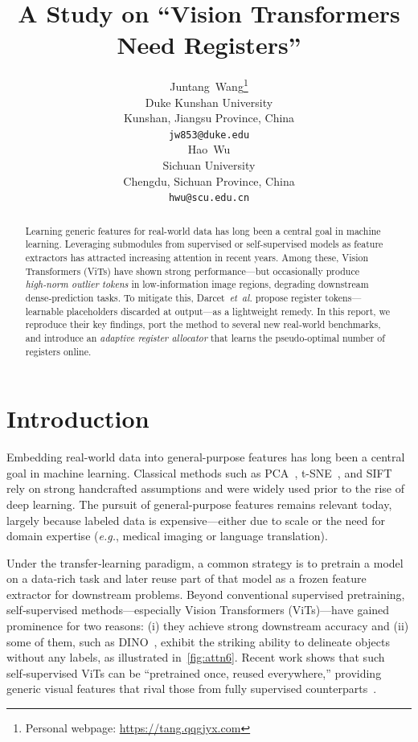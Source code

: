\documentclass{article}
\title{A Study on ``Vision Transformers Need Registers''}
\author{%
  Juntang~Wang\thanks{Personal webpage: \url{https://tang.qqgjyx.com}} \\
  Duke Kunshan University\\
  Kunshan, Jiangsu Province, China \\
  \texttt{jw853@duke.edu} \\
  \And
  Hao~Wu \\
  Sichuan University \\
  Chengdu, Sichuan Province, China \\
  \texttt{hwu@scu.edu.cn}
}
\newcommand{\citep}{\parencite}
\begin{document}
\maketitle


\begin{abstract}
    Learning generic features for real-world data has long been a central goal in machine learning.
    Leveraging submodules from supervised or self-supervised models as feature extractors has attracted increasing attention in recent years.
    Among these, Vision Transformers (ViTs) have shown strong performance—but occasionally produce \emph{high‑norm outlier tokens} in low‑information image regions, degrading downstream dense‑prediction tasks.
    To mitigate this, Darcet~\emph{et~al.} propose register tokens—learnable placeholders discarded at output—as a lightweight remedy. 
    In this report, we reproduce their key findings, port the method to several new real‑world benchmarks, and introduce an \emph{adaptive register allocator} that learns the pseudo‑optimal number of registers online.
\end{abstract}

\section{Introduction}
\label{sec:intro}
Embedding real-world data into general-purpose features has long been a central goal in machine learning.
Classical methods such as PCA~\citep{jolliffePrincipalComponentAnalysis1986}, t-SNE~\citep{maatenVisualizingDataUsing2008}, and SIFT~\citep{loweDistinctiveImageFeatures2004} rely on strong handcrafted assumptions and were widely used prior to the rise of deep learning. 
The pursuit of general-purpose features remains relevant today, largely because labeled data is expensive—either due to scale or the need for domain expertise (\emph{e.g.}, medical imaging or language translation).

Under the transfer‑learning paradigm, a common strategy is to pretrain a model on a data‑rich task and later reuse part of that model as a frozen feature extractor for downstream problems.
Beyond conventional supervised pretraining, self‑supervised methods—especially Vision Transformers (ViTs)—have gained prominence for two reasons: (i) they achieve strong downstream accuracy and (ii) some of them, such as DINO~\citep{caronEmergingPropertiesSelfsupervised2021}, exhibit the striking ability to delineate objects without any labels, as illustrated in~\cref{fig:attn6}.
Recent work shows that such self‑supervised ViTs can be “pretrained once, reused everywhere,” providing generic visual features that rival those from fully supervised counterparts~\citep{caronEmergingPropertiesSelfsupervised2021, oquabDINOv2LearningRobust2024}.
\end{document}
